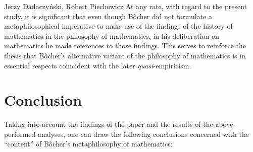 \begin{artengenv}{Jerzy Dadaczyński, Robert Piechowicz}
At any rate, with regard to the present study, it is significant that even though Bôcher did not formulate a metaphilosophical imperative to make use of the findings of the history of mathematics in the philosophy of mathematics, in his deliberation on mathematics he made references to those findings. This serves to reinforce the thesis that Bôcher's alternative variant of the philosophy of mathematics is in essential respects coincident with the later \textit{quasi}-empiricism.

\section{Conclusion}
Taking into account the findings of the paper
\parencite[][]{dadaczynski_tendencje_2015}
 and the results of the above-performed analyses, one can draw the following conclusions concerned with the ``content'' of Bôcher's metaphilosophy of mathematics:


\end{artengenv}
